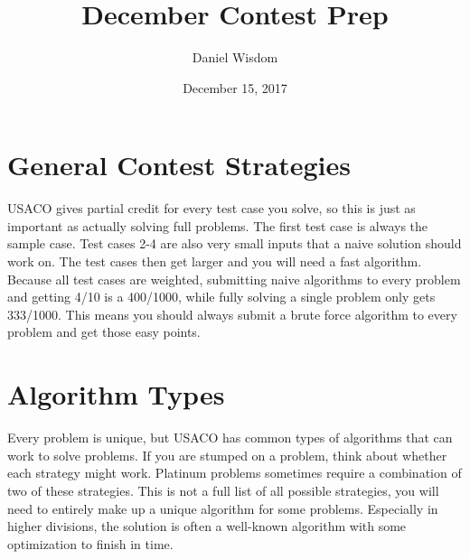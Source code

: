 \documentclass[11pt]{article}
\title{December Contest Prep}
\author{Daniel Wisdom}
\date{December 15, 2017}
\begin{document}
\maketitle

\section{General Contest Strategies}

USACO gives partial credit for every test case you solve, so this is just as important as actually solving full problems.  The first test case is always the sample case.  Test cases 2-4 are also very small inputs that a naive solution should work on.  The test cases then get larger and you will need a fast algorithm.  Because all test cases are weighted, submitting naive algorithms to every problem and getting 4/10 is a 400/1000, while fully solving a single problem only gets 333/1000.  This means you should always submit a brute force algorithm to every problem and get those easy points.

\section{Algorithm Types}

Every problem is unique, but USACO has common types of algorithms that can work to solve problems.  If you are stumped on a problem, think about whether each strategy might work.  Platinum problems sometimes require a combination of two of these strategies.  This is not a full list of all possible strategies, you will need to entirely make up a unique algorithm for some problems.  Especially in higher divisions, the solution is often a well-known algorithm with some optimization to finish in time.
\end{document}
